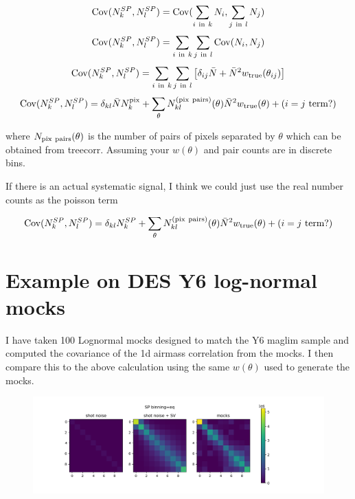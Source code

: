 \documentclass[12pt]{article}
\begin{document}
\begin{equation}
{\bf {\rm Cov}}(N^{SP}_k, N^{SP}_l) =  {\bf {\rm Cov}}( \sum_{i { \ \rm in \ } k} N_{i}, \sum_{j { \ \rm in \ } l} N_{j})
\end{equation}
\begin{equation}
{\bf {\rm Cov}}(N^{SP}_k, N^{SP}_l) =  \sum_{i { \ \rm in \ } k} \sum_{j { \ \rm in \ } l} {\bf {\rm Cov}}(N_i, N_j) 
\end{equation}
\begin{equation}
{\bf {\rm Cov}}(N^{SP}_k, N^{SP}_l) =  \sum_{i { \ \rm in \ } k} \sum_{j { \ \rm in \ } l} \left[ \delta_{ij}{\bar N} + {\bar N}^2 w_{\rm true}(\theta_{ij}) \right]
\end{equation}
\begin{equation}
{\bf {\rm Cov}}(N^{SP}_k, N^{SP}_l) =  \delta_{kl} {\bar N} N^{\rm pix}_{k} + \sum_{\theta} N^{\rm (pix \ pairs)}_{kl}(\theta) {\bar N}^2 w_{\rm true}(\theta) + {(i=j \ \rm term?)}
\end{equation}

where $N_{\rm pix \ pairs}(\theta)$ is the number of pairs of pixels separated by $\theta$ which can be obtained from treecorr. Assuming your $w(\theta)$ and pair counts are in discrete bins.

If there is an actual systematic signal, I think we could just use the real number counts as the poisson term

\begin{equation}
{\bf {\rm Cov}}(N^{SP}_k, N^{SP}_l) =  \delta_{kl} N^{SP}_{k} + \sum_{\theta} N^{\rm (pix \ pairs)}_{kl}(\theta) {\bar N}^2 w_{\rm true}(\theta) + {(i=j \ \rm term?)}
\end{equation}

\section{Example on DES Y6 log-normal mocks}

I have taken 100 Lognormal mocks designed to match the Y6 maglim sample and computed the covariance of the 1d airmass correlation from the mocks. I then compare this to the above calculation using the same $w(\theta)$ used to generate the mocks. 

\begin{figure}[h]
    \includegraphics[width=1.2\linewidth]{../test/cov_eq.png}
    \caption{}
    \label{fig:example}
\end{figure}
\end{document}
